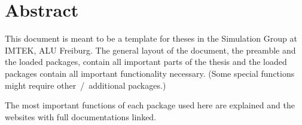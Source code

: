 \chapter*{Abstract}
This document is meant to be a template for theses in the Simulation Group at \gls{IMTEK}, \gls{ALU} Freiburg.
The general layout of the document, the preamble and the loaded packages, contain all important parts of the thesis and the loaded packages contain all important functionality necessary. (Some special functions might require other~/~additional packages.)

The most important functions of each package used here are explained and the websites with full documentations linked.

